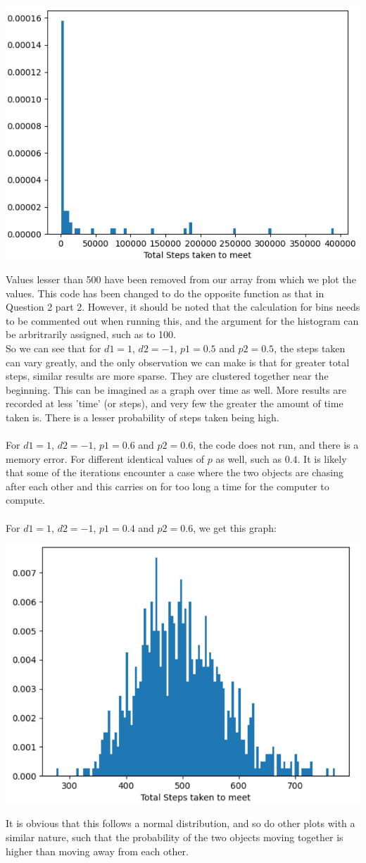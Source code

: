 \documentclass[addpoints]{exam}
\begin{document}
\begin{questions}
\begin{center}
\includegraphics[width=.48\textwidth]{images/p1_3_2.png}
\end{center}
Values lesser than 500 have been removed from our array from which we plot the values. This code has been changed to do the opposite function as that in Question 2 part 2. However, it should be noted that the calculation for bins needs to be commented out when running this, and the argument for the histogram can be arbritrarily assigned, such as to 100. \\
So we can see that for $d1=1$, $d2=-1$, $p1=0.5$ and $p2=0.5$, the steps taken can vary greatly, and the only observation we can make is that for greater total steps, similar results are more sparse. They are clustered together near the beginning. This can be imagined as a graph over time as well. More results are recorded at less 'time' (or steps), and very few the greater the amount of time taken is. There is a lesser probability of steps taken being high.\\ \\
For $d1=1$, $d2=-1$, $p1=0.6$ and $p2=0.6$, the code does not run, and there is a memory error. For different identical values of $p$ as well, such as $0.4$. It is likely that some of the iterations encounter a case where the two objects are chasing after each other and this carries on for too long a time for the computer to compute. \\
\\
For $d1=1$, $d2=-1$, $p1=0.4$ and $p2=0.6$, we get this graph:
\begin{center}
\includegraphics[width=.48\textwidth]{images/p1_3_3.png}
\end{center}
It is obvious that this follows a normal distribution, and so do other plots with a similar nature, such that the probability of the two objects moving together is higher than moving away from each other.
\end{questions}
\end{document}
